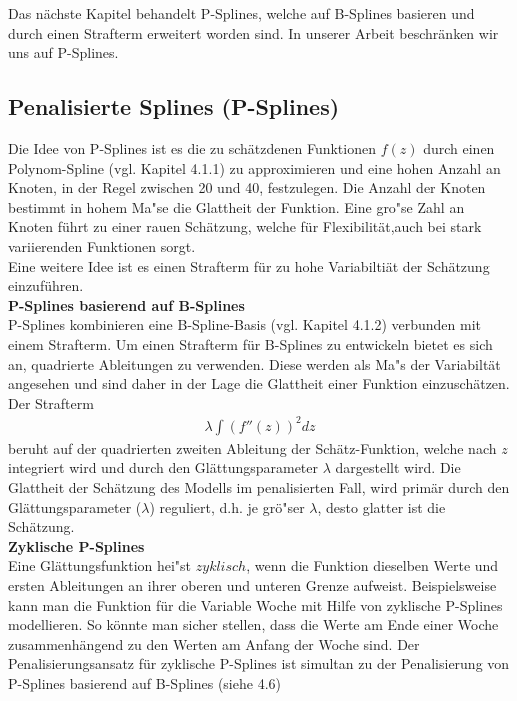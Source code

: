 \documentclass[12pt]{scrreprt}
\begin{document}
\noindent Das nächste Kapitel behandelt P-Splines, welche auf B-Splines basieren und durch einen Strafterm erweitert worden sind. In unserer Arbeit beschränken wir uns auf P-Splines.



\subsection{Penalisierte Splines (P-Splines)} 

Die Idee von P-Splines ist es die zu schätzdenen Funktionen $f(z)$ durch einen Polynom-Spline (vgl. Kapitel 4.1.1) zu approximieren und eine hohen Anzahl an Knoten, in der Regel zwischen 20 und 40, festzulegen. Die Anzahl der Knoten bestimmt in hohem Ma"se die Glattheit der Funktion. Eine gro"se Zahl an Knoten führt zu einer rauen Schätzung, welche für Flexibilität,auch bei stark variierenden Funktionen sorgt. \\
Eine weitere Idee ist es einen Strafterm für zu hohe Variabiltiät der Schätzung einzuführen. \\



\noindent\textbf{P-Splines basierend auf B-Splines} \\
P-Splines kombinieren eine B-Spline-Basis (vgl. Kapitel 4.1.2) verbunden mit einem Strafterm. Um einen Strafterm für B-Splines zu entwickeln bietet es sich an, quadrierte Ableitungen zu verwenden. Diese werden als Ma"s der Variabiltät angesehen und sind daher in der Lage die Glattheit einer Funktion einzuschätzen.
Der Strafterm 
\begin{align}
\lambda\int(f''(z))^2dz
\end{align}
beruht auf der quadrierten zweiten Ableitung der Schätz-Funktion, welche nach $z$ integriert wird und durch den Glättungsparameter $\lambda$ dargestellt wird. Die Glattheit der Schätzung des Modells im penalisierten Fall, wird primär durch den Glättungsparameter ($\lambda$) reguliert, d.h. je grö"ser $\lambda$, desto glatter ist die Schätzung.\\



\noindent\textbf{Zyklische P-Splines} \\
Eine Glättungsfunktion hei"st $zyklisch$, wenn die Funktion dieselben Werte und ersten Ableitungen an ihrer oberen und unteren Grenze aufweist. Beispielsweise kann man die Funktion für die Variable Woche mit Hilfe von zyklische P-Splines modellieren. So könnte man sicher stellen, dass die Werte am Ende einer Woche zusammenhängend zu den Werten am Anfang der Woche sind. Der Penalisierungsansatz für zyklische P-Splines ist simultan zu der Penalisierung von P-Splines basierend auf B-Splines (siehe 4.6) \\
\end{document}
